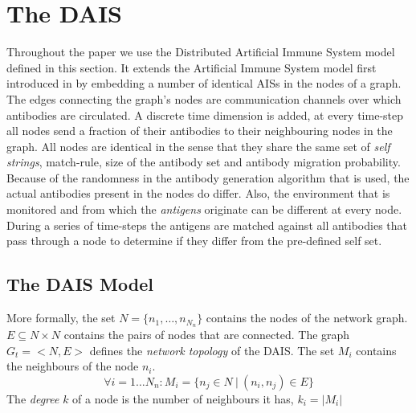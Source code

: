 \documentclass{article}
\begin{document}
\section{The DAIS}
\label{sec_dais}
Throughout the paper we use the Distributed Artificial Immune System model defined in this section.
It extends the Artificial Immune System model first introduced in \cite{forrest_first} by embedding a number of identical AISs in the nodes of a graph.
The edges connecting the graph's nodes are communication channels over which antibodies are circulated.
A discrete time dimension is added, at every time-step all nodes send a fraction of their antibodies to their neighbouring nodes in the graph.
All nodes are identical in the sense that they share the same set of {\it self strings}, match-rule, size of the antibody set and antibody migration probability.
Because of the randomness in the antibody generation algorithm that is used, the actual antibodies present in the nodes do differ.
Also, the environment that is monitored and from which the {\it antigens} originate can be different at every node.
During a series of time-steps the antigens are matched against all antibodies that pass through a node to determine if they differ from the pre-defined self set.

\subsection{The DAIS Model}
\label{sec_dais_model}
More formally, the set $N = \{n_1, \ldots, n_{N_n}\}$ contains the nodes of the network graph.
$E \subseteq N \times N$ contains the pairs of nodes that are connected.
The graph $G_t = <N,E>$ defines the {\it network topology} of the DAIS.
The set $M_i$ contains the neighbours of the node $n_i$.
\begin{equation}
   \forall i=1 \ldots N_n : M_i = \{ n_j \in N~|~(n_i,n_j) \in E \}
\end{equation}
The {\it degree} $k$ of a node is the number of neighbours it has, $k_i = |M_i|$  
\end{document}
